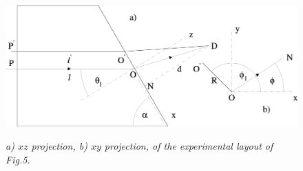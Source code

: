 \documentclass [12pt]{article}
\begin{document}
{\begin{figure}[htbp]
\begin{center}
\hspace*{-0.5cm}\mbox{
\includegraphics[width=5in]{poptf6c.eps}}
\caption{{\sl a) $xz$ projection, b) $xy$ projection, of the experimental
 layout of Fig.5.}} 
\label{fig-fig6}
\end{center}
\end{figure}

}
\end{document}

